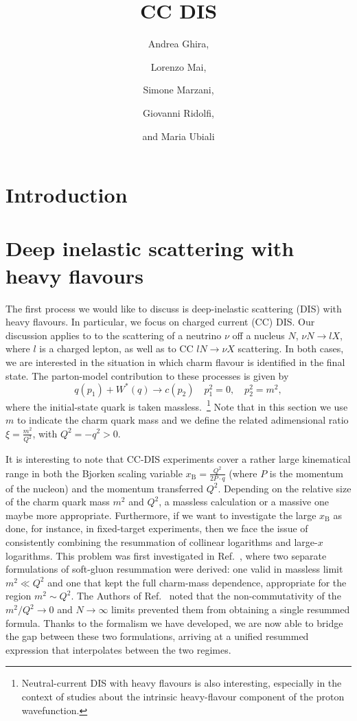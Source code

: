 \documentclass[letterpaper,11pt]{article}
\title{
CC DIS
}
\author[1]{Andrea Ghira,}
\author[1]{Lorenzo Mai,}
\author[1]{Simone Marzani,}
\author[1]{Giovanni Ridolfi,}
\author[2]{and Maria Ubiali}
\affiliation[1]{Dipartimento di Fisica, Universit\`a di Genova and INFN, Sezione di Genova,Via Dodecaneso 33, 16146, Italy}
\affiliation[2]{DAMTP, University of Cambridge, Wilberforce Road, Cambridge, CB3 0WA, United Kingdom}
\begin{document}
\maketitle


\section{Introduction}\label{sec:intro}



\section{Deep inelastic scattering with heavy flavours}\label{sec:dis}

The first process we would like to discuss is deep-inelastic scattering (DIS) with heavy flavours. In particular, we focus on charged current (CC) DIS. Our discussion applies to to the scattering of a neutrino $\nu$ off a nucleus $N$, $\nu N \to l X$, where $l$ is a charged lepton, as well as to CC  $l N \to \nu X$ scattering. In both cases, we are interested in the situation in which charm flavour is identified in the final state. The parton-model contribution to these processes is given by
\begin{equation}
	q(p_1)+W^*(q)\to c (p_2)\quad p_1^2=0,\quad p_2^2=m^2,
\end{equation}
where the initial-state quark is taken massless.~\footnote{Neutral-current DIS with heavy flavours is also interesting, especially in the context  of studies about the intrinsic heavy-flavour component of the proton wavefunction.} Note that in this section we use $m$ to indicate the charm quark mass and we define the related adimensional ratio $\xi=\frac{m^2}{Q^2}$, with $Q^2=-q^2>0$.


%
It is interesting to note that CC-DIS experiments cover a rather large kinematical range in both the Bjorken scaling variable $x_\text{B}= \frac{Q^2}{2 P\cdot q}$ (where $P$ is the momentum of the nucleon) and the momentum transferred $Q^2$. 
Depending on the relative size of the charm quark mass $m^2$ and $Q^2$, a massless calculation or a massive one maybe more appropriate. 
%
Furthermore, if we want to investigate the large $x_{\text{B}}$ as done, for instance, in fixed-target experiments, then we face the issue of consistently combining the resummation of collinear logarithms and large-$x$ logarithms.
%
This problem was first investigated in Ref.~\cite{Corcella:2003ib}, where two separate formulations of soft-gluon resummation were derived: one valid in massless limit $m^2 \ll Q^2$ and one that kept the full charm-mass dependence, appropriate for the region $m^2 \sim Q^2$. 
%
The Authors of Ref.~\cite{Corcella:2003ib} noted that the non-commutativity of the $m^2/Q^2 \to 0$ and $N \to \infty$ limits prevented them from obtaining a single resummed formula. 
%
%
Thanks to the formalism we have developed, we are now able to bridge the gap between these two formulations, arriving at a unified resummed expression that interpolates between the two regimes.
\end{document}
